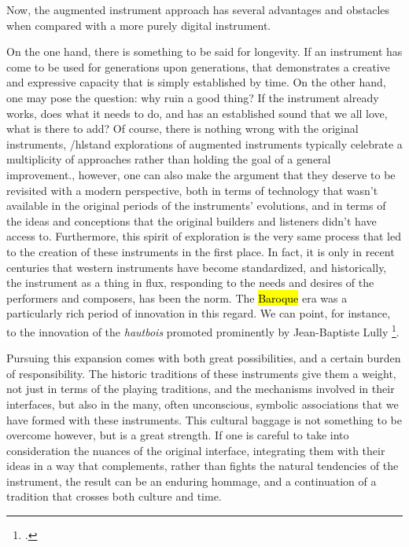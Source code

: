 \documentclass[12pt,twoside,maitrise]{dms_ks}
\theoremstyle{definition}
\begin{document}

Now, the augmented instrument approach has several advantages and obstacles when compared with a more purely digital instrument. 

On the one hand, there is something to be said for longevity.
If an instrument has come to be used for generations upon generations, that demonstrates a creative and expressive capacity that is simply established by time.
On the other hand, one may pose the question: why ruin a good thing?
If the instrument already works, does what it needs to do, and has an established sound that we all love, what is there to add?
Of course, there is nothing wrong with the original instruments, /hlst{and explorations of augmented instruments typically celebrate a multiplicity of approaches rather than holding the goal of a general improvement.}, however, one can also make the argument that they deserve to be revisited with a modern perspective, both in terms of technology that wasn't available in the original periods of the instruments' evolutions, and in terms of the ideas and conceptions that the original builders and listeners didn't have access to. 
Furthermore, this spirit of exploration is the very same process that led to the creation of these instruments in the first place.
In fact, it is only in recent centuries that western instruments have become standardized, and historically, the instrument as a thing in flux, responding to the needs and desires of the performers and composers, has been the norm.
The \hl{Baroque} era was a particularly rich period of innovation in this regard.
We can point, for instance, to the innovation of the \textit{hautbois} promoted prominently by Jean-Baptiste Lully \footcite{wainwright_renaissance_2017}.


Pursuing this expansion comes with both great possibilities, and a certain burden of responsibility.
The historic traditions of these instruments give them a weight, not just in terms of the playing traditions, and the mechanisms involved in their interfaces, but also in the many, often unconscious, symbolic associations that we have formed with these instruments.
This cultural baggage is not something to be overcome however, but is a great strength.
If one is careful to take into consideration the nuances of the original interface, integrating them with their ideas in a way that complements, rather than fights the natural tendencies of the instrument, the result can be an enduring hommage, and a continuation of a tradition that crosses both culture and time.
\end{document}

